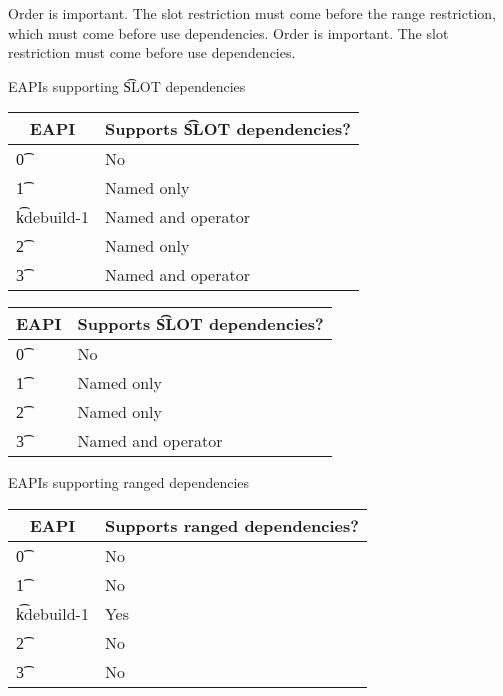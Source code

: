 \IFKDEBUILDELSE
{
    \note Order is important. The slot restriction must come before the range restriction, which
    must come before use dependencies.
}{
    \note Order is important. The slot restriction must come before use dependencies.
}

\begin{centertable}{EAPIs supporting \t{SLOT} dependencies} \label{tab:slot-deps-table}
\IFKDEBUILDELSE
{
    \begin{tabular}{ l l }
        \toprule
            \multicolumn{1}{c}{\textbf{EAPI}} &
            \multicolumn{1}{c}{\textbf{Supports \t{SLOT} dependencies?}} \\
            \midrule
    \t{0} & No \\
    \t{1} & Named only \\
    \t{kdebuild-1} & Named and operator \\
    \t{2} & Named only \\
    \t{3} & Named and operator \\
    \bottomrule
    \end{tabular}
}{
    \begin{tabular}{ l l }
        \toprule
            \multicolumn{1}{c}{\textbf{EAPI}} &
            \multicolumn{1}{c}{\textbf{Supports \t{SLOT} dependencies?}} \\
            \midrule
    \t{0} & No \\
    \t{1} & Named only \\
    \t{2} & Named only \\
    \t{3} & Named and operator \\
    \bottomrule
    \end{tabular}
}
\end{centertable}

\IFKDEBUILDELSE
{
    \begin{centertable}{EAPIs supporting ranged dependencies} \label{tab:range-deps-table}
    \begin{tabular}{ l l }
        \toprule
        \multicolumn{1}{c}{\textbf{EAPI}} &
        \multicolumn{1}{c}{\textbf{Supports ranged dependencies?}} \\
        \midrule
    \t{0} & No \\
    \t{1} & No \\
    \t{kdebuild-1} & Yes \\
    \t{2} & No \\
    \t{3} & No \\
    \bottomrule
    \end{tabular}
    \end{centertable}
}{
}

